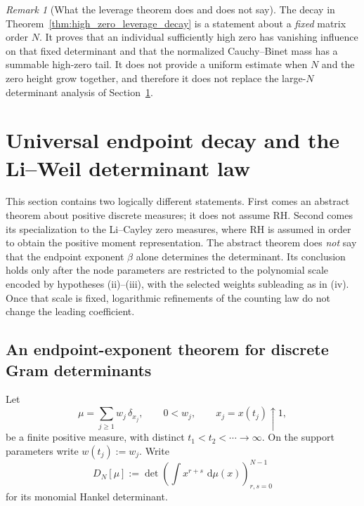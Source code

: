\documentclass[preprint,12pt]{elsarticle}
\numberwithin{equation}{section}
\theoremstyle{plain}
\theoremstyle{definition}
\theoremstyle{remark}
\newtheorem{remark}[theorem]{Remark}
\newcommand{\RH}{\mathrm{RH}}
\newcommand{\dd}{\,\mathrm d}
\begin{document}
\begin{remark}[What the leverage theorem does and does not say]
\label{rem:leverage_scope}
The decay in Theorem~\ref{thm:high_zero_leverage_decay} is a statement about a \emph{fixed} matrix order $N$.  It proves that an individual sufficiently high zero has vanishing influence on that fixed determinant and that the normalized Cauchy--Binet mass has a summable high-zero tail.  It does not provide a uniform estimate when $N$ and the zero height grow together, and therefore it does not replace the large-$N$ determinant analysis of Section~\ref{sec:determinant_decay}.
\end{remark}

\section{Universal endpoint decay and the Li--Weil determinant law}
\label{sec:determinant_decay}

This section contains two logically different statements.  First comes an abstract theorem about
positive discrete measures; it does not assume \(\RH\).  Second comes its specialization to the
Li--Cayley zero measures, where \(\RH\) is assumed in order to obtain the positive moment
representation.  The abstract theorem does \emph{not} say that the endpoint exponent \(\beta\) alone
determines the determinant.  Its conclusion holds only after the node parameters are restricted to
the polynomial scale encoded by hypotheses (ii)--(iii), with the selected weights subleading as in
(iv).  Once that scale is fixed, logarithmic refinements of the counting law do not change the
leading coefficient.

\subsection{An endpoint-exponent theorem for discrete Gram determinants}

Let
\begin{equation}
\mu=\sum_{j\ge1}w_j\,\delta_{x_j},
\qquad
0<w_j,
\qquad
x_j=x(t_j)\uparrow1,
\label{eq:abstract_discrete_measure}
\end{equation}
be a finite positive measure, with distinct $t_1<t_2<\cdots\to\infty$.  On the support
parameters write \(w(t_j):=w_j\).  Write
\begin{equation}
D_N[\mu]
:=\det\left(\int x^{r+s}\,\dd\mu(x)\right)_{r,s=0}^{N-1}
\label{eq:abstract_hankel_determinant}
\end{equation}
for its monomial Hankel determinant.
\end{document}
